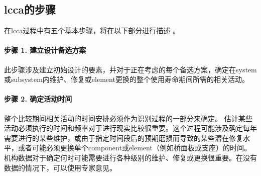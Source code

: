 \subsection{\texorpdfstring{\acrlong*{lcca}}{全生命周期成本分析}的步骤}
在\acrlong{lcca}过程中有五个基本步骤，将在以下部分进行描述 \cite{fhwa2002l}。
\paragraph*{步骤 1. 建立设计备选方案}
此步骤涉及建立初始设计的要素，并对于正在考虑的每个备选方案，确定在\gls*{system}或\gls*{subsystem}内维护、修复或\gls*{element}更换的整个使用寿命期间所需的相关活动。

\paragraph*{步骤 2. 确定活动时间}
整个比较期间相关活动的时间安排必须作为识别过程的一部分来确定。 估计某些活动必须执行的时间和频率对于进行现实比较很重要。这个过程可能涉及确定每年需要进行的某些维护，或由于指定时间段后的预期磨损而导致的某些潜在修复水平，或者可能必须更换单个\gls*{component}或\gls*{element}（例如桥面板或支座）的时间。 机构数据对于确定何时可能需要进行各种级别的维护、修复或更换很重要。在没有数据的情况下，可以使用专家意见。

